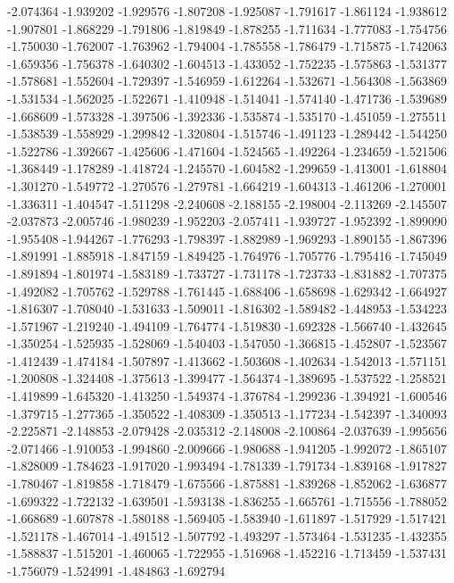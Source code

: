 -2.074364
-1.939202
-1.929576
-1.807208
-1.925087
-1.791617
-1.861124
-1.938612
-1.907801
-1.868229
-1.791806
-1.819849
-1.878255
-1.711634
-1.777083
-1.754756
-1.750030
-1.762007
-1.763962
-1.794004
-1.785558
-1.786479
-1.715875
-1.742063
-1.659356
-1.756378
-1.640302
-1.604513
-1.433052
-1.752235
-1.575863
-1.531377
-1.578681
-1.552604
-1.729397
-1.546959
-1.612264
-1.532671
-1.564308
-1.563869
-1.531534
-1.562025
-1.522671
-1.410948
-1.514041
-1.574140
-1.471736
-1.539689
-1.668609
-1.573328
-1.397506
-1.392336
-1.535874
-1.535170
-1.451059
-1.275511
-1.538539
-1.558929
-1.299842
-1.320804
-1.515746
-1.491123
-1.289442
-1.544250
-1.522786
-1.392667
-1.425606
-1.471604
-1.524565
-1.492264
-1.234659
-1.521506
-1.368449
-1.178289
-1.418724
-1.245570
-1.604582
-1.299659
-1.413001
-1.618804
-1.301270
-1.549772
-1.270576
-1.279781
-1.664219
-1.604313
-1.461206
-1.270001
-1.336311
-1.404547
-1.511298
-2.240608
-2.188155
-2.198004
-2.113269
-2.145507
-2.037873
-2.005746
-1.980239
-1.952203
-2.057411
-1.939727
-1.952392
-1.899090
-1.955408
-1.944267
-1.776293
-1.798397
-1.882989
-1.969293
-1.890155
-1.867396
-1.891991
-1.885918
-1.847159
-1.849425
-1.764976
-1.705776
-1.795416
-1.745049
-1.891894
-1.801974
-1.583189
-1.733727
-1.731178
-1.723733
-1.831882
-1.707375
-1.492082
-1.705762
-1.529788
-1.761445
-1.688406
-1.658698
-1.629342
-1.664927
-1.816307
-1.708040
-1.531633
-1.509011
-1.816302
-1.589482
-1.448953
-1.534223
-1.571967
-1.219240
-1.494109
-1.764774
-1.519830
-1.692328
-1.566740
-1.432645
-1.350254
-1.525935
-1.528069
-1.540403
-1.547050
-1.366815
-1.452807
-1.523567
-1.412439
-1.474184
-1.507897
-1.413662
-1.503608
-1.402634
-1.542013
-1.571151
-1.200808
-1.324408
-1.375613
-1.399477
-1.564374
-1.389695
-1.537522
-1.258521
-1.419899
-1.645320
-1.413250
-1.549374
-1.376784
-1.299236
-1.394921
-1.600546
-1.379715
-1.277365
-1.350522
-1.408309
-1.350513
-1.177234
-1.542397
-1.340093
-2.225871
-2.148853
-2.079428
-2.035312
-2.148008
-2.100864
-2.037639
-1.995656
-2.071466
-1.910053
-1.994860
-2.009666
-1.980688
-1.941205
-1.992072
-1.865107
-1.828009
-1.784623
-1.917020
-1.993494
-1.781339
-1.791734
-1.839168
-1.917827
-1.780467
-1.819858
-1.718479
-1.675566
-1.875881
-1.839268
-1.852062
-1.636877
-1.699322
-1.722132
-1.639501
-1.593138
-1.836255
-1.665761
-1.715556
-1.788052
-1.668689
-1.607878
-1.580188
-1.569405
-1.583940
-1.611897
-1.517929
-1.517421
-1.521178
-1.467014
-1.491512
-1.507792
-1.493297
-1.573464
-1.531235
-1.432355
-1.588837
-1.515201
-1.460065
-1.722955
-1.516968
-1.452216
-1.713459
-1.537431
-1.756079
-1.524991
-1.484863
-1.692794
